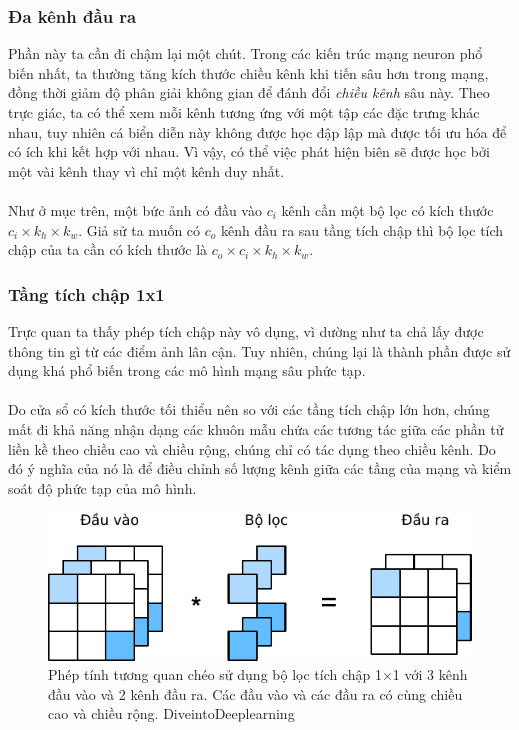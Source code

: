 \documentclass{article}
\begin{document}
\subsubsection{Đa kênh đầu ra}
Phần này ta cần đi chậm lại một chút. Trong các kiến trúc mạng neuron phổ biến nhất, ta thường tăng kích thước chiều kênh khi tiến sâu hơn trong mạng, đồng thời giảm độ phân giải không gian để đánh đổi \textit{chiều kênh} sâu này. Theo trực giác, ta có thể xem mỗi kênh tương ứng với một tập các đặc trưng khác nhau, tuy nhiên cá biển diễn này không được học đập lập mà được tối ưu hóa để có ích khi kết hợp với nhau. Vì vậy, có thể việc phát hiện biên sẽ được học bởi một vài kênh thay vì chỉ một kênh duy nhất.\\\\
Như ở mục trên, một bức ảnh có đầu vào $c_i$ kênh cần một bộ lọc có kích thước $c_i\times k_h\times k_w$. Giả sử ta muốn có $c_o$ kênh đầu ra sau tầng tích chập thì bộ lọc tích chập của ta cần có kích thước là $c_o \times c_i \times k_h \times k_w$.
\subsubsection{Tầng tích chập 1x1}
Trực quan ta thấy phép tích chập này vô dụng, vì dường như ta chả lấy được thông tin gì từ các điểm ảnh lân cận. Tuy nhiên, chúng lại là thành phần được sử dụng khá phổ biến trong các mô hình mạng sâu phức tạp.\\\\
Do cửa sổ có kích thước tối thiểu nên so với các tầng tích chập lớn hơn, chúng mất đi khả năng nhận dạng các khuôn mẫu chứa các tương tác giữa các phần tử liền kề theo chiều cao và chiều rộng, chúng chỉ có tác dụng theo chiều kênh. Do đó ý nghĩa của nó là để điều chỉnh số lượng kênh giữa các tầng của mạng và kiểm soát độ phức tạp của mô hình.
\begin{figure}[ht!]
    \centering
    \includegraphics[width = 0.7\linewidth]{conv-1x1.pdf}
    \caption{Phép tính tương quan chéo sử dụng bộ lọc tích chập  1×1
  với 3 kênh đầu vào và 2 kênh đầu ra. Các đầu vào và các đầu ra có cùng chiều cao và chiều rộng. DiveintoDeeplearning}
    \label{fig4}
\end{figure}
\end{document}
